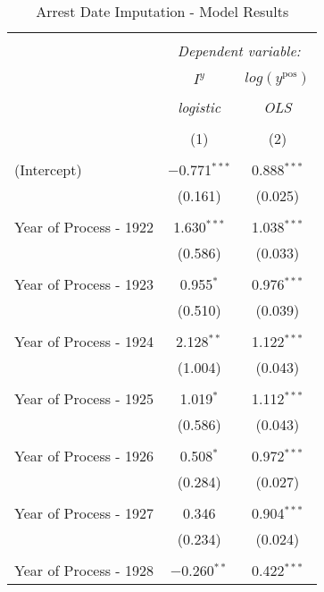 
\begin{table}[!htbp] \centering 
  \caption{Arrest Date Imputation - Model Results} 
  \label{tab:date_imp_results} 
\begin{tabular}{@{\extracolsep{5pt}}lcc} 
\\[-1.8ex]\hline 
\hline \\[-1.8ex] 
 & \multicolumn{2}{c}{\textit{Dependent variable:}} \\ 
\cline{2-3} 
\\[-1.8ex] & $I^y$ & $log(y^{\text{pos}})$ \\ 
\\[-1.8ex] & \textit{logistic} & \textit{OLS} \\ 
\\[-1.8ex] & (1) & (2)\\ 
\hline \\[-1.8ex] 
 (Intercept) & $-$0.771$^{***}$ & 0.888$^{***}$ \\ 
  & (0.161) & (0.025) \\ 
  & & \\ 
 Year of Process - 1922 & 1.630$^{***}$ & 1.038$^{***}$ \\ 
  & (0.586) & (0.033) \\ 
  & & \\ 
 Year of Process - 1923 & 0.955$^{*}$ & 0.976$^{***}$ \\ 
  & (0.510) & (0.039) \\ 
  & & \\ 
 Year of Process - 1924 & 2.128$^{**}$ & 1.122$^{***}$ \\ 
  & (1.004) & (0.043) \\ 
  & & \\ 
 Year of Process - 1925 & 1.019$^{*}$ & 1.112$^{***}$ \\ 
  & (0.586) & (0.043) \\ 
  & & \\ 
 Year of Process - 1926 & 0.508$^{*}$ & 0.972$^{***}$ \\ 
  & (0.284) & (0.027) \\ 
  & & \\ 
 Year of Process - 1927 & 0.346 & 0.904$^{***}$ \\ 
  & (0.234) & (0.024) \\ 
  & & \\ 
 Year of Process - 1928 & $-$0.260$^{**}$ & 0.422$^{***}$ \\ 

\end{tabular}
\end{table}
